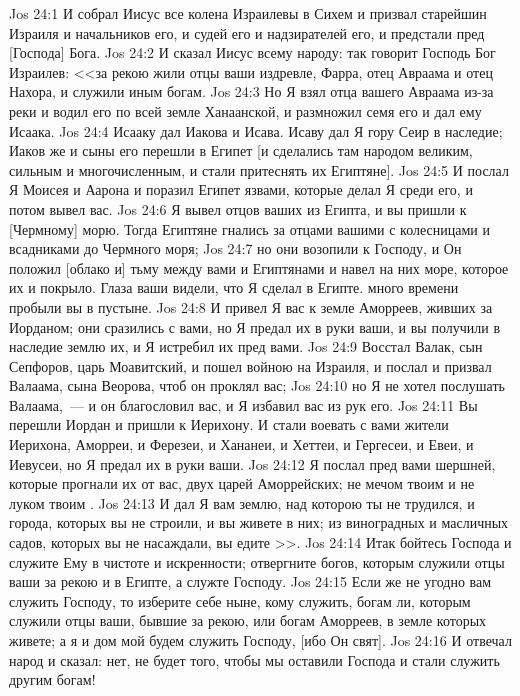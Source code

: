 \vs Jos 24:1 И собрал Иисус все колена Израилевы в Сихем и призвал старейшин Израиля и начальников его, и судей его и надзирателей его, и предстали пред [Господа] Бога.
\vs Jos 24:2 И сказал Иисус всему народу: так говорит Господь Бог Израилев: <<за рекою жили отцы ваши издревле, Фарра, отец Авраама и отец Нахора, и служили иным богам.
\vs Jos 24:3 Но Я взял отца вашего Авраама из-за реки и водил его по всей земле Ханаанской, и размножил семя его и дал ему Исаака.
\vs Jos 24:4 Исааку дал Иакова и Исава. Исаву дал Я гору Сеир в наследие; Иаков же и сыны его перешли в Египет [и сделались там народом великим, сильным и многочисленным, и стали притеснять их Египтяне].
\vs Jos 24:5 И послал Я Моисея и Аарона и поразил Египет язвами, которые делал Я среди его, и потом вывел вас.
\vs Jos 24:6 Я вывел отцов ваших из Египта, и вы пришли к [Чермному] морю. Тогда Египтяне гнались за отцами вашими с колесницами и всадниками до Чермного моря;
\vs Jos 24:7 но они возопили к Господу, и Он положил [облако и] тьму между вами и Египтянами и навел на них море, которое их и покрыло. Глаза ваши видели, что Я сделал в Египте.  много времени пробыли вы в пустыне.
\vs Jos 24:8 И привел Я вас к земле Аморреев, живших за Иорданом; они сразились с вами, но Я предал их в руки ваши, и вы получили в наследие землю их, и Я истребил их пред вами.
\vs Jos 24:9 Восстал Валак, сын Сепфоров, царь Моавитский, и пошел войною на Израиля, и послал и призвал Валаама, сына Веорова, чтоб он проклял вас;
\vs Jos 24:10 но Я не хотел послушать Валаама,~--- и он благословил вас, и Я избавил вас из рук его.
\vs Jos 24:11 Вы перешли Иордан и пришли к Иерихону. И стали воевать с вами жители Иерихона, Аморреи, и Ферезеи, и Хананеи, и Хеттеи, и Гергесеи, и Евеи, и Иевусеи, но Я предал их в руки ваши.
\vs Jos 24:12 Я послал пред вами шершней, которые прогнали их от вас, двух царей Аморрейских; не мечом твоим и не луком твоим .
\vs Jos 24:13 И дал Я вам землю, над которою ты не трудился, и города, которых вы не строили, и вы живете в них; из виноградных и масличных садов, которых вы не насаждали, вы едите >>.
\vs Jos 24:14 Итак бойтесь Господа и служите Ему в чистоте и искренности; отвергните богов, которым служили отцы ваши за рекою и в Египте, а служте Господу.
\vs Jos 24:15 Если же не угодно вам служить Господу, то изберите себе ныне, кому служить, богам ли, которым служили отцы ваши, бывшие за рекою, или богам Аморреев, в земле которых живете; а я и дом мой будем служить Господу, [ибо Он свят].
\vs Jos 24:16 И отвечал народ и сказал: нет, не будет того, чтобы мы оставили Господа и стали служить другим богам!
